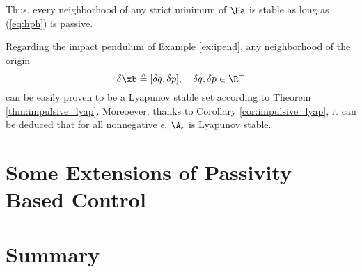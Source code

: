 %
Thus, every neighborhood of any strict minimum of $\Ha$ is stable as long as (\ref{eq:hph}) is passive.
%
\begin{rem}
    Regarding the impact pendulum of Example \ref{ex:ipend}, any neighborhood of the origin
    \begin{equation}
        \delta\xb\triangleq [\delta q,\delta p],\quad\delta q,\delta p\in\R^+
    \end{equation}
    can be easily proven to be a Lyapunov stable set according to Theorem \ref{thm:impulsive_lyap}. Moreoever, thanks to Corollary \ref{cor:impulsive_lyap}, it can be deduced that for all nonnegative $\epsilon$, $\A_\epsilon$ is Lyapunov stable.
\end{rem}
%
\clearpage

\section{Some Extensions of Passivity--Based Control}

\clearpage

\section{Summary}
